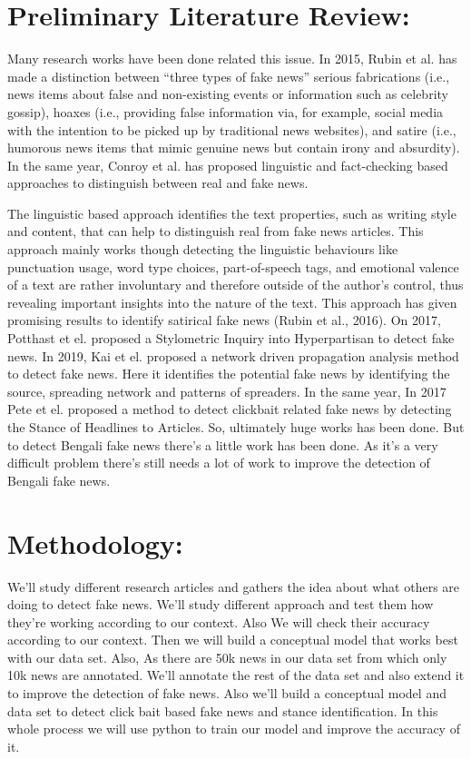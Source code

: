 \documentclass{article}
\begin{document}
    	\section{Preliminary Literature Review:}
     Many research works have been done related this issue. In 2015, Rubin et al. has made a distinction between “three types of fake news” serious fabrications (i.e., news items about false and non-existing events or information such as celebrity gossip), hoaxes (i.e., providing false information via, for example, social media with the intention to be picked up by traditional news websites), and satire (i.e., humorous news items that mimic genuine news but contain irony and absurdity). In the same year, Conroy et al. has proposed linguistic and fact-checking based approaches to distinguish between real and fake news.
     \par The linguistic based approach identifies the text properties, such as writing style and content, that can help to distinguish real from fake news articles. This approach mainly works though detecting the linguistic behaviours like punctuation usage, word type choices, part-of-speech tags, and emotional valence of a text are rather involuntary and therefore outside of the author’s control, thus revealing important insights into the nature of the text. This approach has given promising results to identify satirical fake news (Rubin et al., 2016). On 2017, Potthast et el. proposed a Stylometric Inquiry into Hyperpartisan to detect fake news. In 2019, Kai et el. proposed a network driven propagation analysis method to detect fake news. Here it identifies the potential fake news by identifying the source, spreading network and patterns of spreaders. In the same year, In 2017 Pete et el. proposed a method to detect clickbait related fake news by detecting the Stance of Headlines to Articles.
     So, ultimately huge works has been done. But to detect Bengali fake news there's a little work has been done. As it's a very difficult problem there's still needs a lot of work to improve the detection of Bengali fake news.
        

	               
    	\section{Methodology:}
        We'll study different research articles and gathers the idea about what others are doing to detect fake news. We'll study different approach and test them how they're working according to our context. Also We will check their accuracy according to our context. Then we will build a conceptual model that works best with our data set. Also, As there are 50k news in our data set from which only 10k news are annotated. We'll annotate the rest of the data set and also extend it to improve the detection of fake news. Also we'll build a conceptual model and data set to detect click bait based fake news and stance identification. In this whole process we will use python to train our model and improve the accuracy of it.
        
\end{document}
